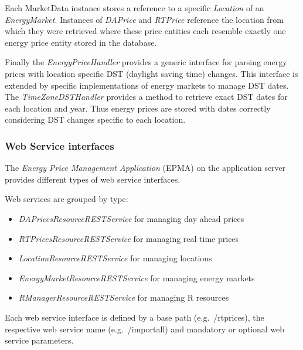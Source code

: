 Each MarketData instance stores a reference to a specific \textit{Location} of an \textit{EnergyMarket}. Instances of \textit{DAPrice} and \textit{RTPrice} reference the location from which they were retrieved where these price entities each resemble exactly one energy price entity stored in the database.

Finally the \textit{EnergyPriceHandler} provides a generic interface for parsing energy prices with location specific DST (daylight saving time) changes. This interface is extended by specific implementations of energy markets to manage DST dates. The \textit{TimeZoneDSTHandler} provides a method to retrieve exact DST dates for each location and year. Thus energy prices are stored with dates correctly considering DST changes specific to each location. 

\subsubsection{Web Service interfaces}

The \textit{Energy Price Management Application} (EPMA) on the application server provides different types of web service interfaces. 

Web services are grouped by type: 

\begin{itemize}
	\item \textit{DAPricesResourceRESTService} for managing day ahead prices
	\item \textit{RTPricesResourceRESTService} for managing real time prices
	\item \textit{LocationResourceRESTService} for managing locations
	\item \textit{EnergyMarketResourceRESTService} for managing energy markets
	\item \textit{RManagerResourceRESTService} for managing R resources
\end{itemize}

Each web service interface is defined by a base path (e.g.~/rtprices), the respective web service name (e.g.~/importall) and mandatory or optional web service parameters. 

%





